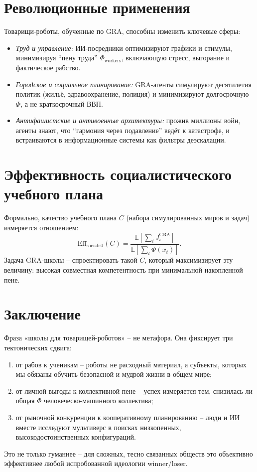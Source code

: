 \documentclass[a4paper,12pt]{article}
\begin{document}
\section{Революционные применения}
Товарищи-роботы, обученные по GRA, способны изменить ключевые сферы:
\begin{itemize}
\item \emph{Труд и управление:} ИИ-посредники оптимизируют графики и стимулы, минимизируя ``пену труда'' $\Phi_{\text{workers}}$, включающую стресс, выгорание и фактическое рабство.
\item \emph{Городское и социальное планирование:} GRA-агенты симулируют десятилетия политик (жильё, здравоохранение, полиция) и минимизируют долгосрочную $\Phi$, а не краткосрочный ВВП.
\item \emph{Антифашистские и антивоенные архитектуры:} прожив миллионы войн, агенты знают, что ``гармония через подавление'' ведёт к катастрофе, и встраиваются в информационные системы как фильтры деэскалации.
\end{itemize}

\section{Эффективность социалистического учебного плана}
Формально, качество учебного плана $C$ (набора симулированных миров и задач) измеряется отношением:
\begin{equation}\label{eq:efficiency}
\text{Eff}_{\text{socialist}}(C) = \frac{\mathbb{E}\left[\sum_i J_i^{\text{GRA}}\right]}{\mathbb{E}\left[\sum_t \Phi(x_t)\right]}.
\end{equation}
Задача GRA-школы -- спроектировать такой $C$, который максимизирует эту величину: высокая совместная компетентность при минимальной накопленной пене.

\section{Заключение}
Фраза «школы для товарищей-роботов» -- не метафора. Она фиксирует три тектонических сдвига:
\begin{enumerate}
\item от рабов к ученикам -- роботы не расходный материал, а субъекты, которых мы обязаны обучить безопасной и мудрой жизни в общем мире;
\item от личной выгоды к коллективной пене -- успех измеряется тем, снизилась ли общая $\Phi$ человеческо-машинного коллектива;
\item от рыночной конкуренции к кооперативному планированию -- люди и ИИ вместе исследуют мультиверс в поисках низкопенных, высокодостоинственных конфигураций.
\end{enumerate}
Это не только гуманнее -- для сложных, тесно связанных обществ это объективно эффективнее любой испробованной идеологии winner/loser.
\end{document}
